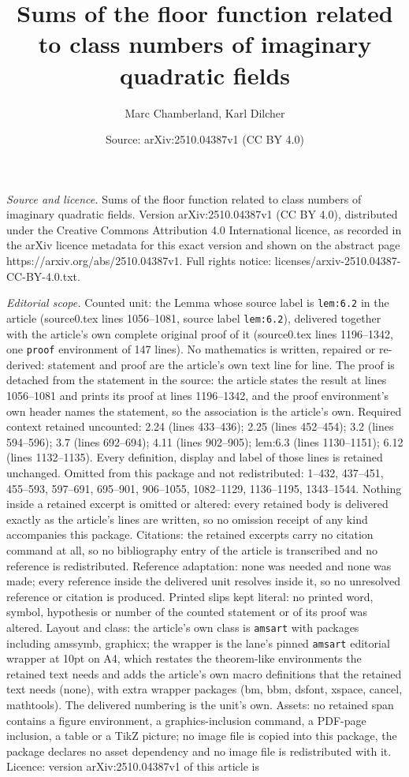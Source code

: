 \documentclass[10pt,a4paper]{amsart}
\title[Sums of the floor function related to class numbers of imagi]{Sums of the floor function related to class numbers of imaginary quadratic fields}
\author{Marc Chamberland, Karl Dilcher}
\date{Source: arXiv:2510.04387v1 (CC BY 4.0)}
\begin{document}
\maketitle

\noindent\emph{Source and licence.} Sums of the floor function related to class numbers of imaginary quadratic fields. Version arXiv:2510.04387v1 (CC BY 4.0), distributed under the Creative Commons Attribution 4.0 International licence, as recorded in the arXiv licence metadata for this exact version and shown on the abstract page https://arxiv.org/abs/2510.04387v1. Full rights notice: licenses/arxiv-2510.04387-CC-BY-4.0.txt.\par\smallskip

\noindent\textit{Editorial scope.} Counted unit: the Lemma whose source label is \texttt{lem:6.2} in the article (source0.tex lines 1056--1081, source label \texttt{lem:6.2}), delivered together with the article's own complete original proof of it (source0.tex lines 1196--1342, one \texttt{proof} environment of 147 lines). No mathematics is written, repaired or re-derived: statement and proof are the article's own text line for line. The proof is detached from the statement in the source: the article states the result at lines 1056--1081 and prints its proof at lines 1196--1342, and the proof environment's own header names the statement, so the association is the article's own. Required context retained uncounted: 2.24 (lines 433--436); 2.25 (lines 452--454); 3.2 (lines 594--596); 3.7 (lines 692--694); 4.11 (lines 902--905); lem:6.3 (lines 1130--1151); 6.12 (lines 1132--1135). Every definition, display and label of those lines is retained unchanged. Omitted from this package and not redistributed: 1--432, 437--451, 455--593, 597--691, 695--901, 906--1055, 1082--1129, 1136--1195, 1343--1544. Nothing inside a retained excerpt is omitted or altered: every retained body is delivered exactly as the article's lines are written, so no omission receipt of any kind accompanies this package. Citations: the retained excerpts carry no citation command at all, so no bibliography entry of the article is transcribed and no reference is redistributed. Reference adaptation: none was needed and none was made; every reference inside the delivered unit resolves inside it, so no unresolved reference or citation is produced. Printed slips kept literal: no printed word, symbol, hypothesis or number of the counted statement or of its proof was altered. Layout and class: the article's own class is \texttt{amsart} with packages including amssymb, graphicx; the wrapper is the lane's pinned \texttt{amsart} editorial wrapper at 10pt on A4, which restates the theorem-like environments the retained text needs and adds the article's own macro definitions that the retained text needs (none), with extra wrapper packages (bm, bbm, dsfont, xspace, cancel, mathtools). The delivered numbering is the unit's own. Assets: no retained span contains a figure environment, a graphics-inclusion command, a PDF-page inclusion, a table or a TikZ picture; no image file is copied into this package, the package declares no asset dependency and no image file is redistributed with it. Licence: version arXiv:2510.04387v1 of this article is 
\end{document}
